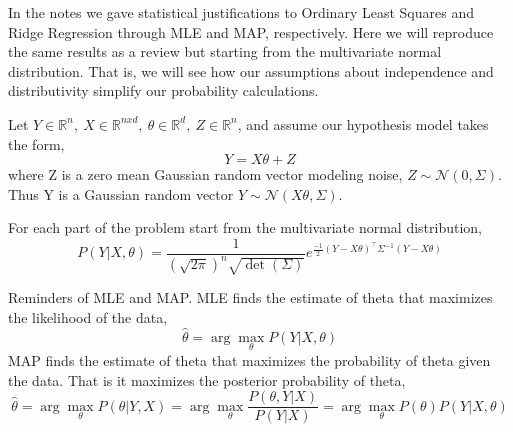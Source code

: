 In the notes we gave statistical justifications to Ordinary Least Squares and Ridge Regression through MLE and MAP, respectively. Here we will reproduce the same results as a review but starting from the multivariate normal distribution. That is, we will see how our assumptions about independence and distributivity simplify our probability calculations.

Let $Y \in \mathbb R^n, \ X \in \mathbb R^{nxd}, \ \theta \in \mathbb R^d, \ Z \in \mathbb R^n$, and assume our hypothesis model takes the form,
$$ Y = X\theta + Z $$
where Z is a zero mean Gaussian random vector modeling noise, $Z \sim \mathcal N (0, \Sigma)$. Thus Y is a Gaussian random vector $Y \sim \mathcal N(X\theta, \Sigma)$.

For each part of the problem start from the multivariate normal distribution,
$$ P(Y|X, \theta) = \frac{1}{(\sqrt{2\pi})^n \sqrt{\det(\Sigma)}}  e^{\frac{-1}{2} (Y - X\theta)^\top \Sigma^{-1} (Y - X\theta)}$$

Reminders of MLE and MAP. MLE finds the estimate of theta that maximizes the likelihood of the data, $$\hat \theta = \arg \max_\theta P(Y|X, \theta)$$ 
MAP finds the estimate of theta that maximizes the probability of theta given the data. That is it maximizes the posterior probability of theta, $$\hat \theta = \arg \max_\theta P(\theta| Y, X) = \arg \max_\theta \frac{P(\theta, Y|X)}{P(Y|X)} = \arg \max_\theta P(\theta)P(Y| X, \theta)$$


